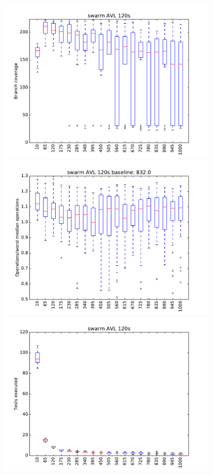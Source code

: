 \begin{figure}
\includegraphics[width=\columnwidth]{graphs/AVLswarm120}
\includegraphics[width=\columnwidth]{graphs/opsavlswarm120}
\includegraphics[width=\columnwidth]{graphs/execavlswarm120}
\end{figure}

